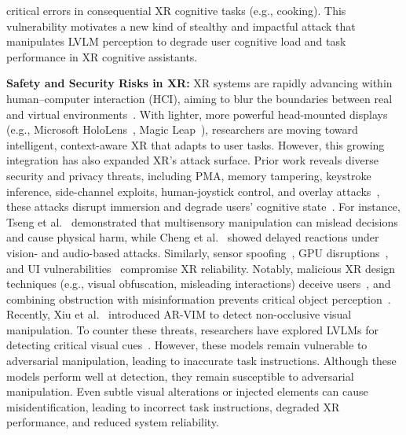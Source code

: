 \documentclass[sigconf,review,anonymous]{acmart}
\begin{document}
critical errors in consequential XR cognitive tasks (e.g., cooking). This vulnerability motivates a new kind of stealthy and impactful attack that manipulates LVLM perception to degrade user cognitive load and task performance in XR cognitive assistants.

\textbf{Safety and Security Risks in XR:} XR systems are rapidly advancing within human–computer interaction (HCI), aiming to blur the boundaries between real and virtual environments~\cite{davis2024analyzing, srinidhi2024xair}. With lighter, more powerful head-mounted displays (e.g., Microsoft HoloLens~\cite{zhang2025evil}, Magic Leap~\cite{srinidhi2024xair}), researchers are moving toward intelligent, context-aware XR that adapts to user tasks. However, this growing integration has also expanded XR’s attack surface. Prior work reveals diverse security and privacy threats, including PMA, memory tampering, keystroke inference, side-channel exploits, human-joystick control, and overlay attacks~\cite{tseng2022dark,humanjoystick,odeleye2021detecting,cheng2023exploring,chandio2024stealthy,slocum2023going,slocum2024doesn,bonnail2023memory,o2024viewpoint,xiu2025viddar,al2021vr,su2024remote,sajid2025just,teymourian2025sok,meteriz2022keylogging,
kundu2025privatexr,ahmed2025adversarial}, these attacks disrupt immersion and degrade users’ cognitive state~\cite{dirksen2025modeling}. For instance, Tseng et al.~\cite{tseng2022dark} demonstrated that multisensory manipulation can mislead decisions and cause physical harm, while Cheng et al.~\cite{cheng2023exploring} showed delayed reactions under vision- and audio-based attacks. Similarly, sensor spoofing~\cite{chandio2024stealthy}, GPU disruptions~\cite{odeleye2021detecting}, and UI vulnerabilities~\cite{slocum2024doesn} compromise XR reliability. Notably, malicious XR design techniques (e.g., visual obfuscation, misleading interactions) deceive users~\cite{tseng2022dark}, and combining obstruction with misinformation prevents critical object perception~\cite{xiu2025viddar}. Recently, Xiu et al.~\cite{xiu2025detecting} introduced AR-VIM to detect non-occlusive visual manipulation. To counter these threats, researchers have explored LVLMs for detecting critical visual cues~\cite{xiu2024lobstar, huang2024effective}. However, these models remain vulnerable to adversarial manipulation, leading to inaccurate task instructions. Although these models perform well at detection, they remain susceptible to adversarial manipulation. Even subtle visual alterations or injected elements can cause misidentification, leading to incorrect task instructions, degraded XR performance, and reduced system reliability.
\end{document}
